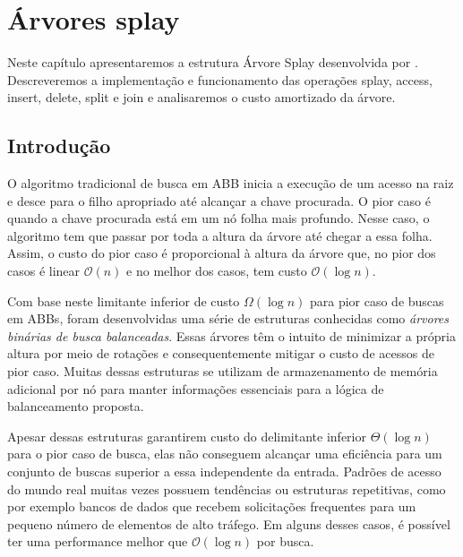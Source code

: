 
\chapter{Árvores splay}
\label{cap:arvores-splay}

\newtheorem{caso}{Caso}

Neste capítulo apresentaremos a estrutura Árvore Splay desenvolvida por \cite{selfadjustingbst}. Descreveremos a implementação e funcionamento das operações splay, access, insert, delete, split e join e analisaremos o custo amortizado da árvore.


\section{Introdução}
O algoritmo tradicional de busca em ABB inicia a execução de um acesso na raiz e desce para o filho apropriado até alcançar a chave procurada. O pior caso é quando a chave procurada está em um nó folha mais profundo. Nesse caso, o algoritmo tem que passar por toda a altura da árvore até chegar a essa folha. Assim, o custo do pior caso é proporcional à altura da árvore que, no pior dos casos é linear $\mathcal{O}(n)$ e no melhor dos casos, tem custo $\mathcal{O}(\log{}n)$.

Com base neste limitante inferior de custo $\Omega(\log{}n)$ para pior caso de buscas em ABBs, foram desenvolvidas uma série de estruturas conhecidas como \textit{árvores binárias de busca balanceadas}. Essas árvores têm o intuito de minimizar a própria altura por meio de rotações e consequentemente mitigar o custo de acessos de pior caso. Muitas dessas estruturas se utilizam de armazenamento de memória adicional por nó para manter informações essenciais para a lógica de balanceamento proposta. 

Apesar dessas estruturas garantirem custo do delimitante inferior $\Theta(\log{}n)$ para o pior caso de busca, elas não conseguem alcançar uma eficiência para um conjunto de buscas superior a essa independente da entrada. Padrões de acesso do mundo real muitas vezes possuem tendências ou estruturas repetitivas, como por exemplo bancos de dados que recebem solicitações frequentes para um pequeno número de elementos de alto tráfego. Em alguns desses casos, é possível ter uma performance melhor que $\mathcal{O}(\log{}n)$ por busca.


